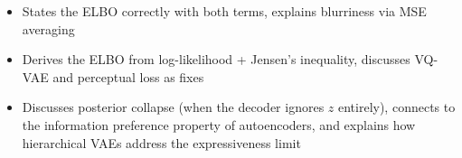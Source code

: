 \begin{interviewq}

\goodgreat
\begin{itemize}
    \item {} States the ELBO correctly with both terms, explains blurriness via MSE averaging
    \item {} Derives the ELBO from log-likelihood + Jensen's inequality, discusses VQ-VAE and perceptual loss as fixes
    \item {} Discusses posterior collapse (when the decoder ignores $z$ entirely), connects to the information preference property of autoencoders, and explains how hierarchical VAEs address the expressiveness limit
\end{itemize}

\end{interviewq}

